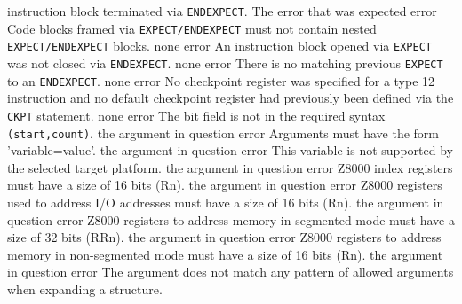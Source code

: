 \documentclass[12pt,twoside]{report}
\begin{document}
\begin{description}
{                instruction block terminated via {\tt ENDEXPECT}.}
               {The error that was expected}
               {error}
               {Code blocks framed via {\tt EXPECT/ENDEXPECT} must not contain
                nested {\tt EXPECT/ENDEXPECT} blocks.}
               {none}
               {error}
               {An instruction block opened via {\tt EXPECT} was not closed via
                {\tt ENDEXPECT}.}
               {none}
               {error}
               {There is no matching previous {\tt EXPECT} to an {\tt ENDEXPECT}.}
               {none}
               {error}
               {No checkpoint register was specified for a type 12 instruction
                and no default checkpoint register had previously been defined
                via the {\tt CKPT} statement.}
               {none}
               {error}
               {The bit field is not in the required syntax {\tt (start,count)}.}
               {the argument in question}
               {error}
               {Arguments must have the form 'variable=value'.}
               {the argument in question}
               {error}
               {This variable is not supported by the selected target platform.}
               {the argument in question}
               {error}
               {Z8000 index registers must have a size of 16 bits (Rn).}
               {the argument in question}
               {error}
               {Z8000 registers used to address I/O addresses must have a size of 16 bits (Rn).}
               {the argument in question}
               {error}
               {Z8000 registers to address memory in segmented mode must have a size of 32 bits (RRn).}
               {the argument in question}
               {error}
               {Z8000 registers to address memory in non-segmented mode must have a size of 16 bits (Rn).}
               {the argument in question}
               {error}
               {The argument does not match any pattern of allowed arguments
                when expanding a structure.}

\end{description}
\end{document}
